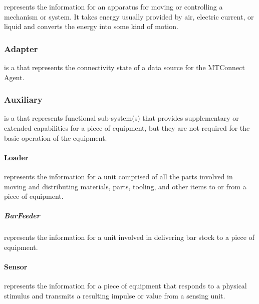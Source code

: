 represents the information for an apparatus for moving or controlling a mechanism or system. It takes energy usually provided by air, electric current, or liquid and converts the energy into some kind of motion.



\subsubsection{Adapter}
\label{sec:Adapter}



 is a  that represents the connectivity state of a data source for the \gls{MTConnect Agent}.



\subsubsection{Auxiliary}
\label{sec:Auxiliary}



 is a  that represents functional sub-system(s) that provides supplementary or extended capabilities for a piece of equipment, but they are not required for the basic operation of the equipment.



\paragraph{Loader}\mbox{}
\label{sec:Loader}


 represents the information for a unit comprised of all the parts involved in moving and distributing materials, parts, tooling, and other items to or from a piece of equipment.



\subparagraph{BarFeeder}\mbox{}
\label{sec:BarFeeder}


 represents the information for a unit involved in delivering bar stock to a piece of equipment.



\paragraph{Sensor}\mbox{}
\label{sec:Sensor}


 represents the information for a piece of equipment that responds to a physical stimulus and transmits a resulting impulse or value from a sensing unit.



